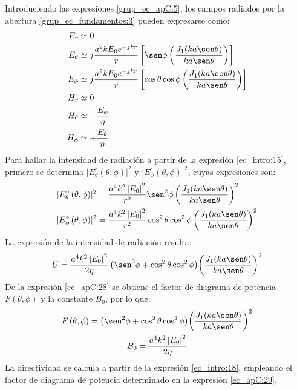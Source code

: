 Introduciendo las expresiones \eqref{grup_ec_apC:5}, los campos radiados por la abertura \eqref{grup_ec_fundamentos:3} pueden expresarse como:
\begin{subequations}
\label{grup_ec_apC:6}
\begin{align}
E_r &\simeq 0
\label{ec_apC:20}\\
E_\theta &\simeq j\frac{a^2kE_0e^{-jkr}}{r}\left[\sen\phi\left(\frac{J_1\!\left(ka\sen\theta\right)}{ka\sen\theta}\right)\right]
\label{ec_apC:21}\\
E_\phi &\simeq j\frac{a^2kE_0e^{-jkr}}{r}\left[\cos\theta\cos\phi\left(\frac{J_1\!\left(ka\sen\theta\right)}{ka\sen\theta}\right)\right]
\label{ec_apC:22}\\
H_r &\simeq 0
\label{ec_apC:23}\\
H_\theta &\simeq -\frac{E_\phi}{\eta}
\label{ec_apC:24}\\
H_\phi &\simeq +\frac{E_\theta}{\eta}
\label{ec_apC:25}
\end{align}
\end{subequations}
Para hallar la intensidad de radiación a partir de la expresión \eqref{ec_intro:15}, primero se determina $\lvert E_{\theta}^{\circ}\left(\theta,\phi\right)\rvert^2$ y $\lvert E_{\phi}^{\circ}\left(\theta,\phi\right)\rvert^2$, cuyas expresiones son:
\begin{subequations}
\label{grup_ec_apC:7}
\begin{align}
\lvert E_{\theta}^{\circ}\left(\theta,\phi\right)\rvert^2 &= \frac{a^4k^2\left|E_0\right|^2}{r^2}\sen^2\phi\left(\frac{J_1\!\left(ka\sen\theta\right)}{ka\sen\theta}\right)^2
\label{ec_apC:26}\\
\lvert E_{\phi}^{\circ}\left(\theta,\phi\right)\rvert^2 &= \frac{a^4k^2\left|E_0\right|^2}{r^2}\cos^2\theta\cos^2\phi\left(\frac{J_1\!\left(ka\sen\theta\right)}{ka\sen\theta}\right)^2
\label{ec_apC:27}
\end{align}
\end{subequations}
La expresión de la intensidad de radiación resulta:
\begin{align}
U = \frac{a^4k^2\left|E_0\right|^2}{2\eta}\left(\sen^2\phi + \cos^2\theta\cos^2\phi \right)\!\left(\frac{J_1\!\left(ka\sen\theta\right)}{ka\sen\theta}\right)^2
\label{ec_apC:28}
\end{align}
De la expresión \eqref{ec_apC:28} se obtiene el factor de diagrama de potencia $F\left(\theta,\phi\right)$ y la constante $B_0$, por lo que:
\begin{gather}
F\left(\theta,\phi\right) = \left(\sen^2\phi + \cos^2\theta\cos^2\phi \right)\!\left(\frac{J_1\!\left(ka\sen\theta\right)}{ka\sen\theta}\right)^2
\label{ec_apC:29}\\
B_0 = \frac{a^4k^2\left|E_0\right|^2}{2\eta}
\label{ec_apC:30}
\end{gather}
La directividad se calcula a partir de la expresión \eqref{ec_intro:18}, empleando el factor de diagrama de potencia determinado en la expresión \eqref{ec_apC:29}.

